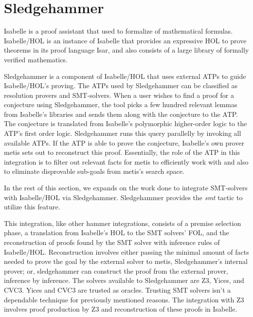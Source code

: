 \documentclass{article}
\begin{document}
\section{Sledgehammer}
\label{sec:sledgehammer}
	Isabelle is a proof assistant that used to 
	formalize of mathematical formulas. Isabelle/HOL 
	is an instance of Isabelle that provides an expressive 
	HOL to prove theorems in its proof language Isar, 
	and also consists of a large library of formally 
	verified mathematics. 
	
	Sledgehammer is a component of Isabelle/HOL that uses 
	external ATPs to guide Isabelle/HOL's proving. The ATPs 
	used by Sledgehammer can be classified as resolution 
	provers and SMT-solvers. When a user wishes to 
	find a proof for a conjecture using Sledgehammer, 
	the tool picks a few hundred relevant 
	lemmas from Isabelle's libraries and sends them along 
	with the conjecture to the ATP. The conjecture is 
	translated from Isabelle's polymorphic higher-order 
	logic to the ATP's first order logic. Sledgehammer 
	runs this query parallelly by invoking all available 
	ATPs. If the ATP is able to prove the conjecture, 
	Isabelle's own prover metis sets out to reconstruct 
	this proof. Essentially, the role of the 
	ATP in this integration is to filter out relevant 
	facts for metis to efficiently work with and 
	also to eliminate disprovable sub-goals from 
	metis's search space.
	
	In the rest of this section, we expands on the work 
	done to integrate SMT-solvers with Isabelle/HOL via 
	Sledgehammer. Sledgehammer provides the \textit{smt}
	tactic to utilize this feature.
	
	This integration, like other hammer integrations, 
	consists of a premise selection phase, a translation 
	from Isabelle's HOL to the SMT solvers' FOL, and the 
	reconstruction of proofs found by the SMT solver with 
	inference rules of Isabelle/HOL. Reconstruction involves 
	either passing the minimal amount of facts needed 
	to prove the goal by the external solver to metis, 
	Sledgehammer's internal prover; or, sledgehammer 
	can construct the proof from the external prover, 
	inference by inference.	The solvers available to 
	Sledgehammer are Z3, Yices, and CVC3. Yices and CVC3 
	are trusted as oracles.	Trusting SMT solvers isn't a 
	dependable technique for previously mentioned reasons. The 
	integration with Z3 involves proof production by 
	Z3 and reconstruction of these proofs in Isabelle.
	
\end{document}
